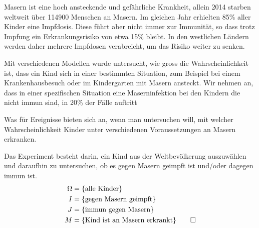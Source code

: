 Masern ist eine hoch ansteckende und gefährliche Krankheit,
allein 2014 starben weltweit über 114900 Menschen an Masern.
Im gleichen Jahr erhielten 85\% aller Kinder eine Impfdosis.
Diese führt aber nicht immer zur Immunität, so dass trotz Impfung
ein Erkrankungsrisiko von etwa 15\% bleibt.
In den westlichen Ländern werden daher mehrere Impfdosen verabreicht,
um das Risiko weiter zu senken.

Mit verschiedenen Modellen wurde untersucht, wie gross die Wahrscheinlichkeit
ist, dass ein Kind sich in einer bestimmten Situation, zum Beispiel
bei einem Krankenhausbesuch oder im Kindergarten mit Masern ansteckt.
Wir nehmen an, dass in einer spezifischen Situation eine Maserninfektion
bei den Kindern die nicht immun sind, in 20\% der Fälle auftritt

Was für Ereignisse bieten sich an, wenn man untersuchen will, mit welcher
Wahrscheinlichkeit Kinder unter verschiedenen Voraussetzungen
an Masern erkranken.


\begin{loesung}
Das Experiment besteht darin, ein Kind aus der Weltbevölkerung auszuwählen
und daraufhin zu untersuchen, ob es gegen Masern geimpft ist und/oder
dagegen immun ist.
\begin{align*}
\Omega &= \{\text{alle Kinder}\}
\\
I&=\{\text{gegen Masern geimpft}\}
\\
J&=\{\text{immun gegen Masern}\}
\\
M&=\{\text{Kind ist an Masern erkrankt}\}
\qedhere
\end{align*}
\end{loesung}
